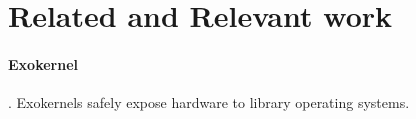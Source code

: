 
\section{Related and Relevant work}

\paragraph*{Exokernel}.   Exokernels\cite{DBLP:conf/sosp/EnglerKO95} safely expose hardware to library operating systems. 



